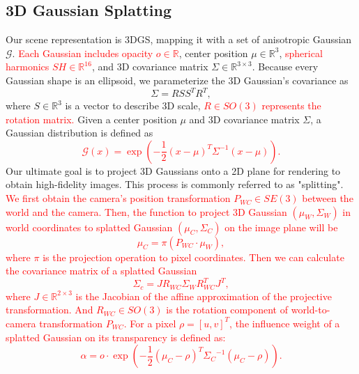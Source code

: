 \documentclass[lettersize,journal]{IEEEtran}
\begin{document}
\subsection{3D Gaussian Splatting}
Our scene representation is 3DGS, mapping it with a set of anisotropic Gaussian $\mathcal{G}$. \textcolor{red}{Each Gaussian includes opacity $o\in\mathbb{R}$}, center position $\mu\in\mathbb{R}^3$, \textcolor{red}{spherical harmonics $SH\in\mathbb{R}^{16}$}, and 3D covariance matrix $\Sigma\in\mathbb{R}^{3\times3}$.
Because every Gaussian shape is an ellipsoid, we parameterize the 3D Gaussian’s covariance as
\begin{equation}
\Sigma = RSS^TR^T,
\label{eq:Sigma}
\end{equation}
where $S\in\mathbb{R}^3$ is a vector to describe 3D scale, \textcolor{red}{$R \in{SO(3)}$ represents the rotation matrix.}
Given a center position $\mu$ and 3D covariance matrix $\Sigma$, a Gaussian distribution is defined as 
\textcolor{red}{\begin{equation}
\mathcal{G}(x)= \exp(-\frac{1}{2}(x-\mu)^{T}\Sigma^{-1}(x-\mu)).
\label{eq:Dx}
\end{equation}}
Our ultimate goal is to project 3D Gaussians onto a 2D plane for rendering to obtain high-fidelity images. This process is commonly referred to as "splitting". \textcolor{red}{We first obtain the camera's position transformation ${P}_{WC}\in{SE(3)}$ between the world and the camera. Then, the function to project 3D Gaussian $(\mu_{W},\Sigma_{W})$ in world coordinates to splatted Gaussian $(\mu_{C},\Sigma_{C})$ on the image plane will be} 
\textcolor{red}
{\begin{equation}
\mu_{C} = \pi({P}_{WC}\cdot\mu_{W}),
\label{eq:muI}
\end{equation}
where $\pi$ is the projection operation to pixel coordinates. Then we can calculate the covariance matrix of a splatted Gaussian
\begin{equation}
\Sigma_{c} = J{R}_{WC}\Sigma_{W}{R}_{WC}^{T}J^{T} ,
\label{eq:sigmaI}
\end{equation}
where $J\in\mathbb{R}^{2\times3}$ is the Jacobian of the affine approximation of the projective transformation. And ${R}_{WC}\in{SO(3)}$ is the rotation component of world-to-camera transformation ${P}_{WC}$.}
\textcolor{red}{For a pixel $\rho = [u,v]^{T}$, the influence weight of a splatted Gaussian on its transparency is defined as:}
\textcolor{red}{\begin{equation}
\mathcal{\alpha}= o\cdot\exp(-\frac{1}{2}(\mu_{C}-\rho)^{T}{\Sigma_{C}}^{-1}(\mu_{C}-\rho)).
\label{eq:alpha}
\end{equation}}
\end{document}
